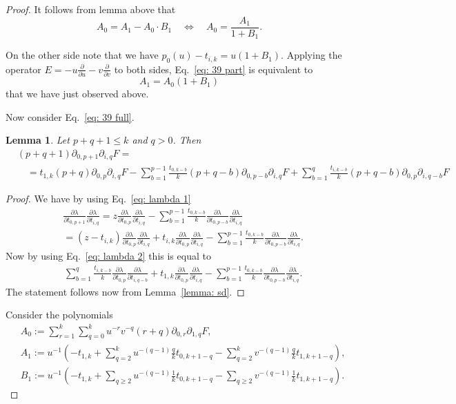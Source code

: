 \documentclass[12pt,a4paper]{amsart}
\newcommand{\p}{{\partial}}
\newcommand{\<}{\left<}
\renewcommand{\>}{\right>}
\newtheorem{lemma}[theorem]{Lemma}
\numberwithin{equation}{section}
\begin{document}
\begin{proof}
It follows from lemma above that
\[
 A_0  = A_1 - A_0 \cdot B_1  \quad \Leftrightarrow \quad A_0 = \frac{A_1}{1 + B_1}.
\]

On the other side note that we have $p_0(u) - t_{i,k} = u (1 + B_1)$. Applying the operator $E = - u \frac{\p}{\p u} - v \frac{\p}{\p v}$ to both sides, Eq.~\eqref{eq: 39 part} is equivalent to
\[
    A_1 = A_0 (1 + B_1)
\]
that we have just observed above.

Now consider Eq.~\eqref{eq: 39 full}.

\begin{lemma}
    Let $p+q+1 \le k$ and $q > 0$. Then
    \begin{align*}
        & (p+q+1)\p_{0,p+1}\p_{i,q} F =
        \\
        &\quad = t_{1,k} (p+q) \p_{0,p}\p_{i,q} F - \sum_{b=1}^{p-1} \frac{t_{0,k-b}}{k} (p+q-b) \p_{0,p-b} \p_{i,q} F + \sum_{b=1}^q \frac{t_{i,k-b}}{k} (p+q-b) \p_{0,p} \p_{i,q-b} F 
    \end{align*}
\end{lemma}
\begin{proof}
    We have by using Eq.~\eqref{eq: lambda 1}
    \begin{align*}
        & \frac{\p \lambda}{\p t_{0,p+1}} \frac{\p \lambda}{\p t_{i,q}} = 
        z \frac{\p \lambda}{\p t_{0,p}} \frac{\p \lambda}{\p t_{i,q}} 
        - \sum_{b=1}^{p-1} \frac{t_{0,k-b}}{k} \frac{\p \lambda}{\p t_{0,p-b}} \frac{\p \lambda}{\p t_{i,q}} 
        \\
        & = (z - t_{i,k}) \frac{\p \lambda}{\p t_{0,p}} \frac{\p \lambda}{\p t_{i,q}} 
        + t_{i,k} \frac{\p \lambda}{\p t_{0,p}} \frac{\p \lambda}{\p t_{i,q}} 
        - \sum_{b=1}^{p-1} \frac{t_{0,k-b}}{k} \frac{\p \lambda}{\p t_{0,p-b}} \frac{\p \lambda}{\p t_{i,q}}.
    \end{align*}
    Now by using Eq.~\eqref{eq: lambda 2} this is equal to
    \begin{align*}
        & \sum_{b=1}^{q} \frac{t_{i,k-b}}{k} \frac{\p \lambda}{\p t_{0,p}} \frac{\p \lambda}{\p t_{i,q-b}} 
        + t_{1,k} \frac{\p \lambda}{\p t_{0,p}} \frac{\p \lambda}{\p t_{i,q}} 
        - \sum_{b=1}^{p-1} \frac{t_{0,k-b}}{k} \frac{\p \lambda}{\p t_{0,p-b}} \frac{\p \lambda}{\p t_{i,q}}.
    \end{align*}
    The statement follows now from Lemma~\ref{lemma: sd}.
    
\end{proof}

Consider the polynomials
\begin{align*}
    & A_0 := \sum_{r=1}^k\sum_{q=0}^k u^{-r} v^{-q} (r+q) \p_{0,r}\p_{1,q} F,
    \\
    & A_1 := u^{-1} \left( -t_{1,k} + \sum_{q=2}^k u^{-(q-1)} \frac{q}{k} t_{0,k+1-q} - \sum_{q=2}^k v^{-(q-1)} \frac{q}{k} t_{1,k+1-q} \right),
    \\
    & B_1 := u^{-1} \left(-t_{1,k} + \sum_{q\ge 2} u^{-(q-1)} \frac{1}{k} t_{0,k+1-q} -  \sum_{q \ge 2} v^{-(q-1)} \frac{1}{k} t_{1,k+1-q} \right).
\end{align*}


\end{proof}
\end{document}
